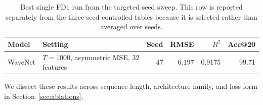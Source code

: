 \begin{table}[t]
\centering
\caption{Best single FD1 run from the targeted seed sweep. This row is reported separately from the three-seed controlled tables because it is selected rather than averaged over seeds.}
\label{tab:sota-chase}
\small
\begin{tabular}{llrrrr}
\toprule
Model & Setting & Seed & RMSE & $R^2$ & Acc@20 \\
\midrule
WaveNet & $T{=}1000$, asymmetric MSE, 32 features & 47 & 6.197 & 0.9175 & 99.71 \\
\bottomrule
\end{tabular}
\end{table}

We dissect these results across sequence length, architecture family, and loss form in Section~\ref{sec:ablations}.
